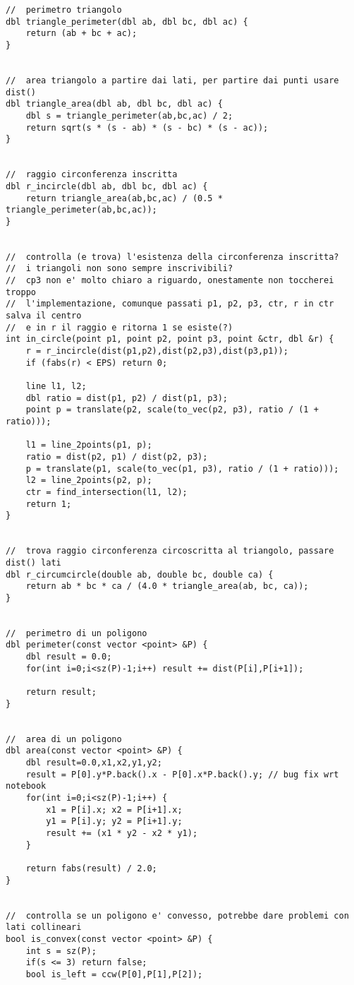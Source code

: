 \documentclass[a4paper,landscape,8pt]{extarticle}
\begin{document}
\begin{multicols}{3}
\begin{lstlisting}
//  perimetro triangolo
dbl triangle_perimeter(dbl ab, dbl bc, dbl ac) {
    return (ab + bc + ac);
}


//  area triangolo a partire dai lati, per partire dai punti usare dist()
dbl triangle_area(dbl ab, dbl bc, dbl ac) {
    dbl s = triangle_perimeter(ab,bc,ac) / 2;
    return sqrt(s * (s - ab) * (s - bc) * (s - ac));
}


//  raggio circonferenza inscritta
dbl r_incircle(dbl ab, dbl bc, dbl ac) {
    return triangle_area(ab,bc,ac) / (0.5 * triangle_perimeter(ab,bc,ac));
}


//  controlla (e trova) l'esistenza della circonferenza inscritta?
//  i triangoli non sono sempre inscrivibili?
//  cp3 non e' molto chiaro a riguardo, onestamente non toccherei troppo
//  l'implementazione, comunque passati p1, p2, p3, ctr, r in ctr salva il centro
//  e in r il raggio e ritorna 1 se esiste(?)
int in_circle(point p1, point p2, point p3, point &ctr, dbl &r) {
    r = r_incircle(dist(p1,p2),dist(p2,p3),dist(p3,p1));
    if (fabs(r) < EPS) return 0;

    line l1, l2;
    dbl ratio = dist(p1, p2) / dist(p1, p3);
    point p = translate(p2, scale(to_vec(p2, p3), ratio / (1 + ratio)));

    l1 = line_2points(p1, p);
    ratio = dist(p2, p1) / dist(p2, p3);
    p = translate(p1, scale(to_vec(p1, p3), ratio / (1 + ratio)));
    l2 = line_2points(p2, p);
    ctr = find_intersection(l1, l2);
    return 1;
}


//  trova raggio circonferenza circoscritta al triangolo, passare dist() lati
dbl r_circumcircle(double ab, double bc, double ca) {
    return ab * bc * ca / (4.0 * triangle_area(ab, bc, ca));
}


//  perimetro di un poligono
dbl perimeter(const vector <point> &P) {
    dbl result = 0.0;
    for(int i=0;i<sz(P)-1;i++) result += dist(P[i],P[i+1]);

    return result;
}


//  area di un poligono
dbl area(const vector <point> &P) {
    dbl result=0.0,x1,x2,y1,y2;
    result = P[0].y*P.back().x - P[0].x*P.back().y; // bug fix wrt notebook
    for(int i=0;i<sz(P)-1;i++) {
        x1 = P[i].x; x2 = P[i+1].x;
        y1 = P[i].y; y2 = P[i+1].y;
        result += (x1 * y2 - x2 * y1);
    }

    return fabs(result) / 2.0;
}


//  controlla se un poligono e' convesso, potrebbe dare problemi con lati collineari
bool is_convex(const vector <point> &P) {
    int s = sz(P);
    if(s <= 3) return false;
    bool is_left = ccw(P[0],P[1],P[2]);


\end{lstlisting}
\end{multicols}
\end{document}
